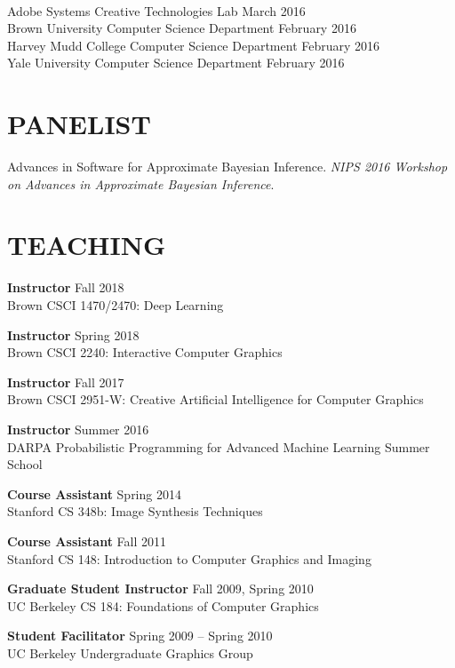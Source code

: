 \documentclass[line,margin]{res}
\begin{document}
\begin{resume}
\\
\talk
	{Adobe Systems}
	{Creative Technologies Lab}
	{March 2016}\\
\talk
	{Brown University}
	{Computer Science Department}
	{February 2016}\\
\talk
	{Harvey Mudd College}
	{Computer Science Department}
	{February 2016}\\
\talk
	{Yale University}
	{Computer Science Department}
	{February 2016}


\section{PANELIST}

\newcommand{\panelist}[2]{
	#1. \emph{#2}.
}

\panelist{Advances in Software for Approximate Bayesian Inference}{NIPS 2016 Workshop on Advances in Approximate Bayesian Inference}


\section{TEACHING}

\newcommand{\teach}[3] {
	\textbf{#1} \hfill #3\\
	#2
}

\teach
{Instructor}
{Brown CSCI 1470/2470: Deep Learning}
{Fall	 2018}

\teach
{Instructor}
{Brown CSCI 2240: Interactive Computer Graphics}
{Spring 2018}

\teach
{Instructor}
{Brown CSCI 2951-W: Creative Artificial Intelligence for Computer Graphics}
{Fall 2017}

\teach
{Instructor}
{DARPA Probabilistic Programming for Advanced Machine Learning Summer School}
{Summer 2016}

\teach
{Course Assistant}
{Stanford CS 348b: Image Synthesis Techniques}
{Spring 2014}

\teach
{Course Assistant}
{Stanford CS 148: Introduction to Computer Graphics and Imaging}
{Fall 2011}

\teach
{Graduate Student Instructor}
{UC Berkeley CS 184: Foundations of Computer Graphics}
{Fall 2009, Spring 2010}

\teach
{Student Facilitator}
{UC Berkeley Undergraduate Graphics Group}
{Spring 2009 -- Spring 2010}


\end{resume}
\end{document}
